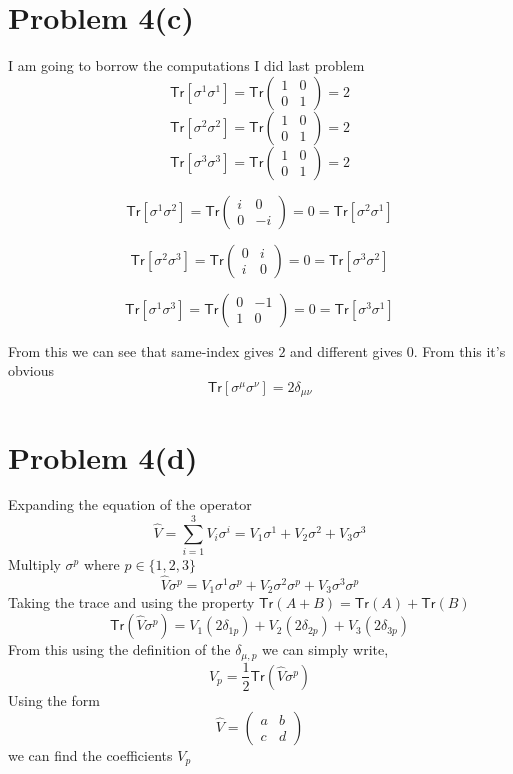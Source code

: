 \documentclass[letter]{article}
\begin{document}
\section*{Problem 4(c)} 
I am going to borrow the computations I did last problem
\[
	\textsf{Tr} [ \sigma^{1 } \sigma ^{1} ] = 
	\textsf{Tr} \begin{pmatrix} 1 & 0 \\ 0 & 1  \end{pmatrix}  = 2
\] 
\[
	\textsf{Tr} [ \sigma^{2 } \sigma ^{2} ] = 
	\textsf{Tr} \begin{pmatrix} 1 & 0 \\ 0 & 1  \end{pmatrix}  = 2
\] 
\[
	\textsf{Tr} [ \sigma^{3 } \sigma ^{3} ] = 
	\textsf{Tr} \begin{pmatrix} 1 & 0 \\ 0 & 1  \end{pmatrix}  = 2
\] 

\[
	\textsf{Tr}[ \sigma^{1} \sigma^{2} ] = 
	\textsf{Tr} \begin{pmatrix} i&0\\0&-i \end{pmatrix} = 0
	= \textsf{Tr}[ \sigma^{2} \sigma^{1} ] 
\] 

\[
	\textsf{Tr}[ \sigma^{2} \sigma^{3} ] = 
	\textsf{Tr} \begin{pmatrix} 0&i\\i&0 \end{pmatrix} = 0
	= \textsf{Tr}[ \sigma^{3} \sigma^{2} ] 
\] 

\[
	\textsf{Tr}[ \sigma^{1} \sigma^{3} ] = 
	\textsf{Tr} \begin{pmatrix} 0&-1\\1&0 \end{pmatrix} = 0
	= \textsf{Tr}[ \sigma^{3} \sigma^{1} ] 
\] 

From this we can see that same-index gives $2$ and different gives 0. From this it's obvious
\[
	\textsf{Tr} [\sigma^{\mu} \sigma^{\nu} ] = 2 \delta_{\mu \nu}
\] 


\section*{Problem 4(d)}
Expanding the equation of the operator
\[
\hat{V} = \sum_{i = 1}^{3} V_i \sigma^{i} = V_1 \sigma^{1} + V_2 \sigma^{2} + V_3 \sigma^{3}
\]
Multiply $\sigma^{p}$ where $p \in \{1,2,3\} $ 
\[
\hat{V} \sigma^{p} = V_1 \sigma^{1} \sigma^{p} + V_2 \sigma^{2} \sigma^{p} + V_3 \sigma^{3} \sigma^{p}
\] 
Taking the trace and using the property $\textsf{Tr} (A + B) = \textsf{Tr} (A) + \textsf{Tr} (B)$  
\[
	\textsf{Tr} (\hat{V} \sigma^{p})  = 
	V_1 \left(2\delta_{1p}\right)+
	V_2 \left(2\delta_{2p}\right)+
	V_3 \left(2\delta_{3p}\right)
\]
From this using the definition of the $\delta_{\mu, p}$ we can simply write, 
\[
	V_p = \frac{1}{2} \textsf{Tr} (\hat{V} \sigma^{p})
\]
Using the form 
\[
	\hat{V} = \begin{pmatrix} a & b \\ c & d \end{pmatrix} 
\] we can find the coefficients $V_p$ 
\end{document}
